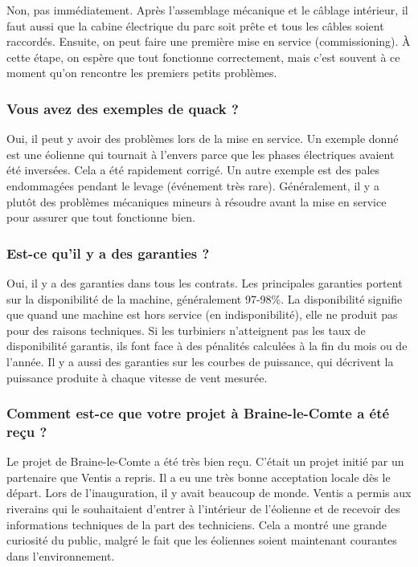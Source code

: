 Non, pas immédiatement. Après l'assemblage mécanique et le câblage intérieur, il faut aussi que la cabine électrique du parc soit prête et tous les câbles soient raccordés. Ensuite, on peut faire une première mise en service (commissioning). À cette étape, on espère que tout fonctionne correctement, mais c'est souvent à ce moment qu'on rencontre les premiers petits problèmes.

\subsubsection{Vous avez des exemples de quack ?}

Oui, il peut y avoir des problèmes lors de la mise en service. Un exemple donné est une éolienne qui tournait à l'envers parce que les phases électriques avaient été inversées. Cela a été rapidement corrigé. Un autre exemple est des pales endommagées pendant le levage (événement très rare). Généralement, il y a plutôt des problèmes mécaniques mineurs à résoudre avant la mise en service pour assurer que tout fonctionne bien.

\subsubsection{Est-ce qu'il y a des garanties ?}

Oui, il y a des garanties dans tous les contrats. Les principales garanties portent sur la disponibilité de la machine, généralement 97-98\%. La disponibilité signifie que quand une machine est hors service (en indisponibilité), elle ne produit pas pour des raisons techniques. Si les turbiniers n'atteignent pas les taux de disponibilité garantis, ils font face à des pénalités calculées à la fin du mois ou de l'année. Il y a aussi des garanties sur les courbes de puissance, qui décrivent la puissance produite à chaque vitesse de vent mesurée.

\subsubsection{Comment est-ce que votre projet à Braine-le-Comte a été reçu ?}

Le projet de Braine-le-Comte a été très bien reçu. C'était un projet initié par un partenaire que Ventis a repris. Il a eu une très bonne acceptation locale dès le départ. Lors de l'inauguration, il y avait beaucoup de monde. Ventis a permis aux riverains qui le souhaitaient d'entrer à l'intérieur de l'éolienne et de recevoir des informations techniques de la part des techniciens. Cela a montré une grande curiosité du public, malgré le fait que les éoliennes soient maintenant courantes dans l'environnement.

